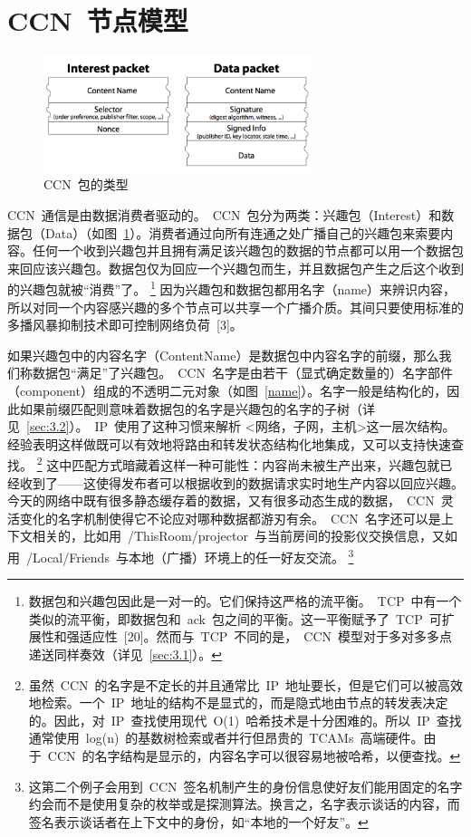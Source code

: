 \section{CCN~节点模型}
\label{sec:2}

\begin{figure}
  \centering
  \includegraphics[width=0.7\textwidth]{images/packet_types}
  \caption{CCN~包的类型} 
  \label{packet_types}
\end{figure}

CCN~通信是由数据消费者驱动的。~CCN~包分为两类：兴趣包（Interest）和数据包（Data）（如图~\ref{packet_types}）。消费者通过向所有连通之处广播自己的兴趣包来索要内容。任何一个收到兴趣包并且拥有满足该兴趣包的数据的节点都可以用一个数据包来回应该兴趣包。数据包仅为回应一个兴趣包而生，并且数据包产生之后这个收到的兴趣包就被“消费”了。
\renewcommand\baselinestretch{1} %
\footnote{数据包和兴趣包因此是一对一的。它们保持这严格的流平衡。~TCP~中有一个类似的流平衡，即数据包和~ack~包之间的平衡。这一平衡赋予了~TCP~可扩展性和强适应性~[20]。然而与~TCP~不同的是，~CCN~模型对于多对多多点递送同样奏效（详见~\ref{sec:3.1}）。}
因为兴趣包和数据包都用名字（name）来辨识内容，所以对同一个内容感兴趣的多个节点可以共享一个广播介质。其间只要使用标准的多播风暴抑制技术即可控制网络负荷~[3]。%

如果兴趣包中的内容名字（ContentName）是数据包中内容名字的前缀，那么我们称数据包“满足”了兴趣包。~CCN~名字是由若干（显式确定数量的）名字部件（component）组成的不透明二元对象（如图~\ref{name}）。名字一般是结构化的，因此如果前缀匹配则意味着数据包的名字是兴趣包的名字的子树（详见~\ref{sec:3.2}）。~IP~使用了这种习惯来解析 <网络，子网，主机>这一层次结构。经验表明这样做既可以有效地将路由和转发状态结构化地集成，又可以支持快速查找。%
\renewcommand\baselinestretch{1} %
\footnote{虽然~CCN~的名字是不定长的并且通常比~IP~地址要长，但是它们可以被高效地检索。一个~IP~地址的结构不是显式的，而是隐式地由节点的转发表决定的。因此，对~IP~查找使用现代~O(1)~哈希技术是十分困难的。所以~IP~查找通常使用~log(n)~的基数树检索或者并行但昂贵的~TCAMs~高端硬件。由于~CCN~的名字结构是显示的，内容名字可以很容易地被哈希，以便查找。}
这中匹配方式暗藏着这样一种可能性：内容尚未被生产出来，兴趣包就已经收到了——这使得发布者可以根据收到的数据请求实时地生产内容以回应兴趣。今天的网络中既有很多静态缓存着的数据，又有很多动态生成的数据，~CCN~灵活变化的名字机制使得它不论应对哪种数据都游刃有余。~CCN~名字还可以是上下文相关的，比如用~/ThisRoom/projector~与当前房间的投影仪交换信息，又如用~/Local/Friends~与本地（广播）环境上的任一好友交流。
\renewcommand\baselinestretch{1} %
\footnote{这第二个例子会用到~CCN~签名机制产生的身份信息使好友们能用固定的名字约会而不是使用复杂的枚举或是探测算法。换言之，名字表示谈话的内容，而签名表示谈话者在上下文中的身份，如“本地的一个好友”。}

